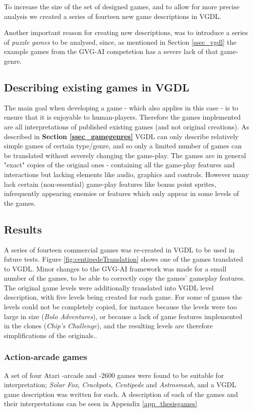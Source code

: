 \documentclass[a4paper,titlepage,final]{report}
\begin{document}
To increase the size of the set of designed games, and to allow for more precise analysis we created a series of fourteen new game descriptions in VGDL. 

Another important reason for creating new descriptions, was to introduce a series of \emph{puzzle games} to be analysed, since, as mentioned in Section \ref{ssec_vgdl} the example games from the GVG-AI competetion has a severe lack of that game-genre. 


\subsection{Describing existing games in VGDL}
The main goal when developing a game - which also applies in this case - is to ensure that it is enjoyable to human-players. 
Therefore the games implemented are all interpretations of published existing games (and not original creations).
As described in \textbf{Section \ref{ssec_gamegenres}} VGDL can only describe relatively simple games of certain type/genre, and so only a limited number of games can be translated without severely changing the game-play.
The games are in general "exact" copies of the original ones - containing all the game-play features and interactions but lacking elements like audio, graphics and controls. However many lack certain (non-essential) game-play features like bonus point sprites, infrequently appearing enemies or features which only appear in some levels of the games.


\subsection{Results}
A series of fourteen commercial games was re-created in VGDL to be used in future tests. 
Figure \ref{fig:centipedeTranslation} shows one of the games translated to VGDL.
Minor changes to the GVG-AI framework was made for a small number of the games, to be able to correctly copy the games' gameplay features.
The original game levels were additionally translated into VGDL level description, with five levels being created for each game.
For some of games the levels could not be completely copied, for instance because the levels were too large in size (\textit{Bolo Adventures}), or because a lack of game features implemented in the clones (\textit{Chip's Challenge}), and the resulting levels are therefore simplifications of the originals..

\subsubsection*{Action-arcade games}
A set of four Atari -arcade and -2600 games were found to be suitable for interpretation; \textit{Solar Fox}, \textit{Crackpots}, \textit{Centipede} and \textit{Astrosmash}, and a VGDL game description was written for each. 
A description of each of the games and their interpretations can be seen in Appendix \ref{app_thesisgames}
\end{document}
